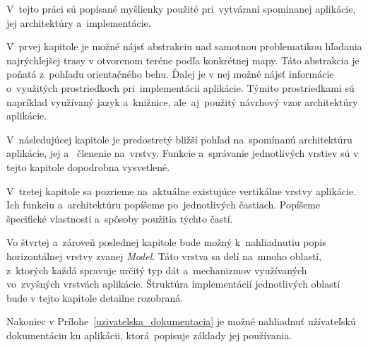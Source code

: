 \bigskip

V~tejto práci sú popísané myšlienky použité pri~vytváraní spomínanej aplikácie, jej architektúry a~implementácie.

V~prvej kapitole je možné nájsť abstrakciu nad samotnou problematikou hľadania najrýchlejšej trasy v otvorenom teréne podľa konkrétnej mapy. Táto abstrakcia je poňatá z~pohľadu orientačného behu. Ďalej je v nej možné nájsť informácie o~využitých prostriedkoch pri~implementácii aplikácie. Týmito prostriedkami sú napríklad využívaný jazyk a~knižnice, ale~aj~použitý návrhový vzor architektúry aplikácie. 

V~následujúcej kapitole je predostretý bližší pohľad na~spomínanú architektúru aplikácie, jej  a~ členenie na~vrstvy. Funkcie a~správanie jednotlivých vrstiev sú v tejto kapitole dopodrobna vysvetlené.

V~tretej kapitole sa pozrieme na~aktuálne existujúce vertikálne vrstvy aplikácie. Ich funkciu a~architektúru popíšeme po~jednotlivých častiach. Popíšeme špecifické vlastnosti a~spôsoby použitia týchto častí. 

Vo štvrtej a~zároveň poslednej kapitole bude možný k~nahliadnutiu popis horizontálnej vrstvy zvanej \textit{Model}. Táto vrstva sa delí na~mnoho oblastí, z~ktorých každá spravuje určitý typ dát a~mechanizmov využívaných vo~zvyšných vrstvách aplikácie. Štruktúra implementácií jednotlivých oblastí bude v tejto kapitole detailne rozobraná.

Nakoniec v Prílohe~\ref{uzivatelska_dokumentacia} je možné nahliadnuť užívateľskú dokumentáciu ku aplikácii, ktorá~popisuje základy jej používania.